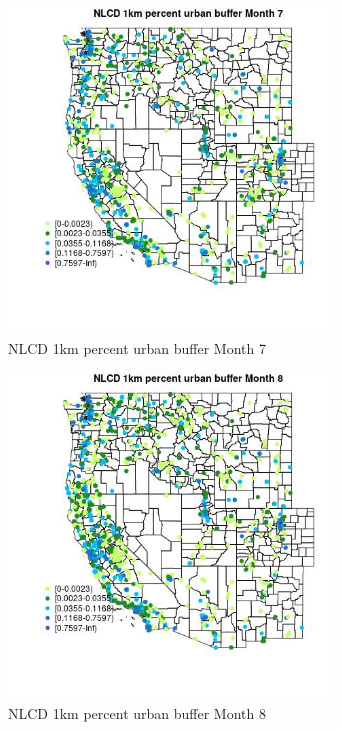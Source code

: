 \begin{figure} 
\centering  
\includegraphics[width=0.77\textwidth]{Code_Outputs/Report_ML_input_PM25_Step4_part_f_de_duplicated_aveswNAs_MapObsMo7NLCD_1km_percent_urban_buffer.jpg} 
\caption{\label{fig:Report_ML_input_PM25_Step4_part_f_de_duplicated_aveswNAsMapObsMo7NLCD_1km_percent_urban_buffer}NLCD 1km percent urban buffer Month 7} 
\end{figure} 
 

\begin{figure} 
\centering  
\includegraphics[width=0.77\textwidth]{Code_Outputs/Report_ML_input_PM25_Step4_part_f_de_duplicated_aveswNAs_MapObsMo8NLCD_1km_percent_urban_buffer.jpg} 
\caption{\label{fig:Report_ML_input_PM25_Step4_part_f_de_duplicated_aveswNAsMapObsMo8NLCD_1km_percent_urban_buffer}NLCD 1km percent urban buffer Month 8} 
\end{figure} 
 

